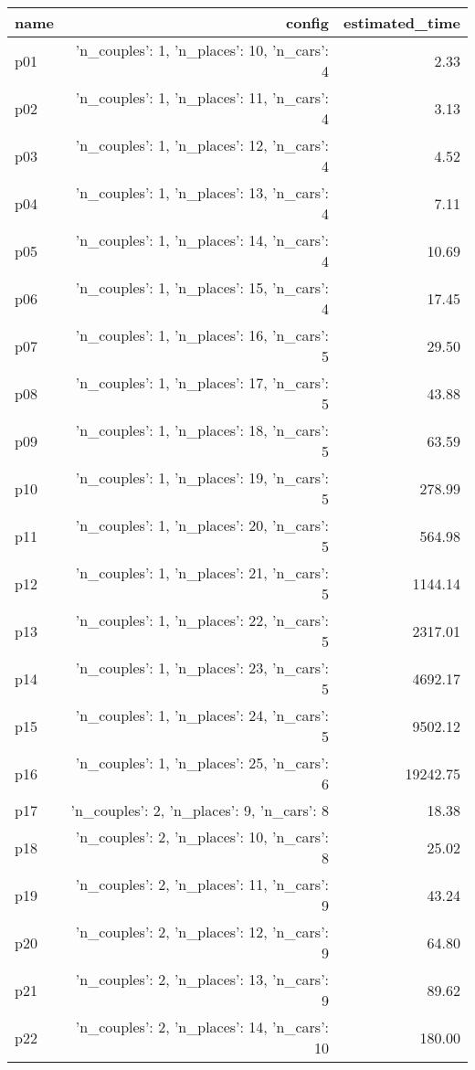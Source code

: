 \documentclass{article}
\begin{document}
                            \begin{center}
                            \scriptsize
                            \begin{tabular}{@{}l|r|r@{}}
                            name & config & estimated\_time\\\midrule
                              p01&{'n\_couples': 1, 'n\_places': 10, 'n\_cars': 4}&2.33\\
  p02&{'n\_couples': 1, 'n\_places': 11, 'n\_cars': 4}&3.13\\
  p03&{'n\_couples': 1, 'n\_places': 12, 'n\_cars': 4}&4.52\\
  p04&{'n\_couples': 1, 'n\_places': 13, 'n\_cars': 4}&7.11\\
  p05&{'n\_couples': 1, 'n\_places': 14, 'n\_cars': 4}&10.69\\
  p06&{'n\_couples': 1, 'n\_places': 15, 'n\_cars': 4}&17.45\\
  p07&{'n\_couples': 1, 'n\_places': 16, 'n\_cars': 5}&29.50\\
  p08&{'n\_couples': 1, 'n\_places': 17, 'n\_cars': 5}&43.88\\
  p09&{'n\_couples': 1, 'n\_places': 18, 'n\_cars': 5}&63.59\\
  p10&{'n\_couples': 1, 'n\_places': 19, 'n\_cars': 5}&278.99\\
  p11&{'n\_couples': 1, 'n\_places': 20, 'n\_cars': 5}&564.98\\
  p12&{'n\_couples': 1, 'n\_places': 21, 'n\_cars': 5}&1144.14\\
  p13&{'n\_couples': 1, 'n\_places': 22, 'n\_cars': 5}&2317.01\\
  p14&{'n\_couples': 1, 'n\_places': 23, 'n\_cars': 5}&4692.17\\
  p15&{'n\_couples': 1, 'n\_places': 24, 'n\_cars': 5}&9502.12\\
  p16&{'n\_couples': 1, 'n\_places': 25, 'n\_cars': 6}&19242.75\\
  p17&{'n\_couples': 2, 'n\_places': 9, 'n\_cars': 8}&18.38\\
  p18&{'n\_couples': 2, 'n\_places': 10, 'n\_cars': 8}&25.02\\
  p19&{'n\_couples': 2, 'n\_places': 11, 'n\_cars': 9}&43.24\\
  p20&{'n\_couples': 2, 'n\_places': 12, 'n\_cars': 9}&64.80\\
  p21&{'n\_couples': 2, 'n\_places': 13, 'n\_cars': 9}&89.62\\
  p22&{'n\_couples': 2, 'n\_places': 14, 'n\_cars': 10}&180.00\\

\end{tabular}
\end{center}
\end{document}
